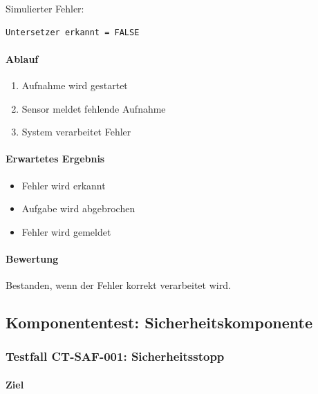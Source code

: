 Simulierter Fehler:

\begin{verbatim}
Untersetzer erkannt = FALSE
\end{verbatim}

\paragraph{Ablauf}\label{ablauf-6}

\begin{enumerate}
\def\labelenumi{\arabic{enumi}.}
\tightlist
\item
  Aufnahme wird gestartet
\item
  Sensor meldet fehlende Aufnahme
\item
  System verarbeitet Fehler
\end{enumerate}

\paragraph{Erwartetes Ergebnis}\label{erwartetes-ergebnis-6}

\begin{itemize}
\tightlist
\item
  Fehler wird erkannt
\item
  Aufgabe wird abgebrochen
\item
  Fehler wird gemeldet
\end{itemize}

\paragraph{Bewertung}\label{bewertung-6}

Bestanden, wenn der Fehler korrekt verarbeitet wird.

\subsection{Komponententest:
Sicherheitskomponente}\label{komponententest-sicherheitskomponente}

\subsubsection{Testfall CT-SAF-001:
Sicherheitsstopp}\label{testfall-ct-saf-001-sicherheitsstopp}

\paragraph{Ziel}\label{ziel-7}

